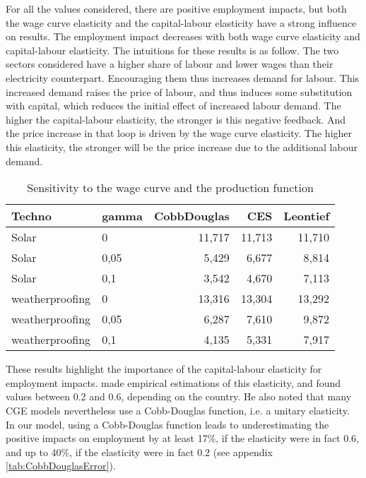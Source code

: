 For all the values considered, there are positive employment impacts, but both the wage curve elasticity and the capital-labour elasticity have a strong influence on results. The employment impact decreases with both wage curve elasticity and capital-labour elasticity.
The intuitions for these results is as follow. The two sectors considered have a higher share of labour and lower wages than their electricity counterpart. Encouraging them thus increases demand for labour. This increased demand raises the price of labour, and thus induces some substitution with capital, which reduces the initial effect of increased labour demand. The higher the capital-labour elasticity, the stronger is this negative feedback.
And the price increase in that loop is driven by the wage curve elasticity. The higher this elasticity, the stronger will be the price increase due to the additional labour demand. 

\begin{table}[!h]
	\centering
	\caption{Sensitivity to the wage curve and the production function}
	\label{tab:wageCurve}
	\begin{tabular}{ll|rrr}
		\toprule
		Techno & gamma & CobbDouglas & CES & Leontief \\
		\midrule
		Solar & 0 & 11,717 & 11,713 & 11,710 \\
		Solar & 0,05 & 5,429 & 6,677 & 8,814 \\
		Solar & 0,1 & 3,542 & 4,670 & 7,113 \\
		\midrule
		weatherproofing & 0 & 13,316 & 13,304 & 13,292 \\
		weatherproofing & 0,05 & 6,287 & 7,610 & 9,872 \\
		weatherproofing & 0,1 & 4,135 & 5,331 & 7,917 \\
		\bottomrule
	\end{tabular}
\end{table}

These results highlight the importance of the capital-labour elasticity for employment impacts. 
\citet{VanderWerf2008} made empirical estimations of this elasticity, and found values between 0.2 and 0.6, depending on the country.  He also noted that many CGE models nevertheless use a Cobb-Douglas function, i.e. a unitary elasticity. In our model, using a Cobb-Douglas function leads to underestimating the positive impacts on employment by at least 17\%, if the elasticity were in fact 0.6, and up to 40\%, if the elasticity were in fact 0.2 (see appendix \ref{tab:CobbDouglasError}).

